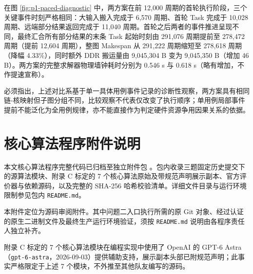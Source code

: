 \documentclass[anonymous,withtoc]{gmcm2026}
\begin{document}
在图 \ref{fig:p1-paced-diagnostic} 中，两方案在前 12,000 周期的首轮执行阶段，三个关键事件时刻严格相同：大输入搬入完成于 6,570 周期、首轮 Task 完成于 10,028 周期、远端部分结果返回完成于 11,040 周期。首轮之后两者的事件推进呈现不同，最终汇合所有部分结果的末条 Task 起始时刻由 291,076 周期提前至 278,472 周期（提前 12,604 周期），整图 Makespan 从 291,222 周期缩短至 278,618 周期（降幅 4.33\%），同时额外 DDR 搬运量由 9,045,304 B 变为 9,045,350 B（增加 46 B）。两方案的完整求解器物理墙钟耗时分别为 0.546 s 与 0.618 s（略有增加，不作提速宣称）。

必须指出，上述对比系基于单一具体用例事件记录的诊断性观察，两方案具有相同链-核映射但子图分组不同，比较观察不代表仅改变了执行顺序；单用例局部事件提前不能泛化为全用例规律，亦不能直接作为判定硬件资源争用因果关系的依据。

\section{核心算法程序附件说明}

本文核心算法程序完整代码已归档至独立附件包 \texttt{}。包内收录三题固定历史提交下的源算法模块、附录 C 标定的 7 个核心算法原始及带规范声明展示副本、官方评价器与依赖源码，以及完整的 SHA-256 哈希校验清单。详细文件目录与运行环境限制参见包内 \texttt{README.md}。

本附件定位为源码审阅附件。其中问题二入口执行所需的原 Git 对象、经过认证的原生二进制文件及最终生产运行环境验证，须按 \texttt{README.md} 说明由各程序责任人独立补齐。

附录 C 标定的 7 个核心算法模块在编程实现中使用了 OpenAI 的 GPT-6 Astra（\texttt{gpt-6-astra}，2026-09-03）提供辅助支持，展示副本头部已附规范声明；此事实严格限定于上述 7 个模块，不外推至其他队友编写的源码。
\end{document}
